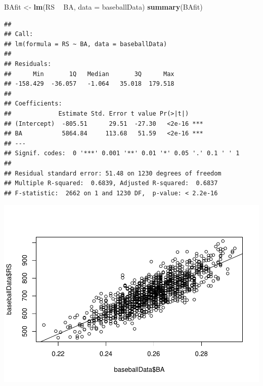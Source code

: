 \documentclass[
]{article}
\newenvironment{Shaded}{\begin{snugshade}}{\end{snugshade}}
\newcommand{\DataTypeTok}[1]{\textcolor[rgb]{0.13,0.29,0.53}{#1}}
\newcommand{\KeywordTok}[1]{\textcolor[rgb]{0.13,0.29,0.53}{\textbf{#1}}}
\newcommand{\NormalTok}[1]{#1}
\newcommand{\OperatorTok}[1]{\textcolor[rgb]{0.81,0.36,0.00}{\textbf{#1}}}
\newcommand{\StringTok}[1]{\textcolor[rgb]{0.31,0.60,0.02}{#1}}
\begin{document}
\begin{Shaded}
\begin{Highlighting}[]
\NormalTok{BAfit <-}\StringTok{ }\KeywordTok{lm}\NormalTok{(RS }\OperatorTok{~}\StringTok{ }\NormalTok{BA, }\DataTypeTok{data =}\NormalTok{ baseballData)}
\KeywordTok{summary}\NormalTok{(BAfit)}
\end{Highlighting}
\end{Shaded}

\begin{verbatim}
## 
## Call:
## lm(formula = RS ~ BA, data = baseballData)
## 
## Residuals:
##      Min       1Q   Median       3Q      Max 
## -158.429  -36.057   -1.064   35.018  179.518 
## 
## Coefficients:
##             Estimate Std. Error t value Pr(>|t|)    
## (Intercept)  -805.51      29.51  -27.30   <2e-16 ***
## BA           5864.84     113.68   51.59   <2e-16 ***
## ---
## Signif. codes:  0 '***' 0.001 '**' 0.01 '*' 0.05 '.' 0.1 ' ' 1
## 
## Residual standard error: 51.48 on 1230 degrees of freedom
## Multiple R-squared:  0.6839, Adjusted R-squared:  0.6837 
## F-statistic:  2662 on 1 and 1230 DF,  p-value: < 2.2e-16
\end{verbatim}

\begin{Shaded}
\end{Shaded}

\includegraphics{HW2_Liu-Zi-Jian_files/figure-latex/unnamed-chunk-33-1.pdf}
\end{document}
